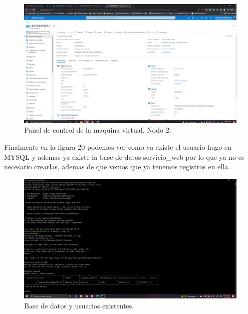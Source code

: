 \documentclass[11pt]{article}
\begin{document}
		\begin{figure}[H]
			\centering
			\includegraphics[scale=0.34]{resources/Panelcontrol2.png}
			\caption{Panel de control de la maquina virtual. Nodo 2.}\label{fig:picture}
		\end{figure}
		Finalmente en la figura 20 podemos ver como ya existe el usuario hugo en MYSQL y ademas ya existe la base de datos servicio\_web por lo que ya no es necesario crearlas, ademas de que vemos que ya tenemos registros en ella.
		\begin{figure}[H]
			\centering
			\includegraphics[scale=0.34]{resources/tp3.png}
			\caption{Base de datos y usuarios existentes.}\label{fig:picture}
		\end{figure}
\end{document}
